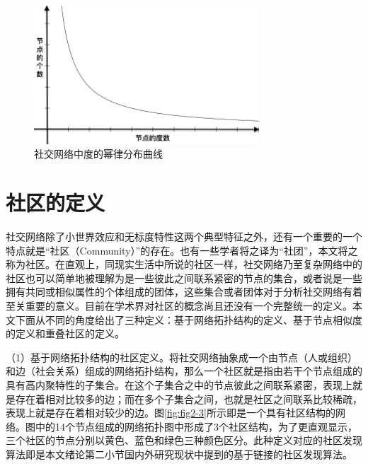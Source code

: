 \begin{figure}
  \centering
  \includegraphics[width=0.75\textwidth]{figures/fig2-2}
  \caption{社交网络中度的幂律分布曲线}\label{fig2-2}
\end{figure}

\section{社区的定义}

社交网络除了小世界效应和无标度特性这两个典型特征之外，还有一个重要的一个特点就是“社区（Community）”的存在。也有一些学者将之译为“社团”，本文将之称为社区。在直观上，同现实生活中所说的社区一样，社交网络乃至复杂网络中的社区也可以简单地被理解为是一些彼此之间联系紧密的节点的集合，或者说是一些拥有共同或相似属性的个体组成的团体，这些集合或者团体对于分析社交网络有着至关重要的意义。目前在学术界对社区的概念尚且还没有一个完整统一的定义。本文下面从不同的角度给出了三种定义：基于网络拓扑结构的定义、基于节点相似度的定义和重叠社区的定义。

（1）基于网络拓扑结构的社区定义。将社交网络抽象成一个由节点（人或组织）和边（社会关系）组成的网络拓扑结构，那么一个社区就是指由若干个节点组成的具有高内聚特性的子集合。在这个子集合之中的节点彼此之间联系紧密，表现上就是存在着相对比较多的边；而在多个子集合之间，也就是社区之间联系比较稀疏，表现上就是存在着相对较少的边。图\ref{fig:fig2-3}所示即是一个具有社区结构的网络。图中的14个节点组成的网络拓扑图中形成了3个社区结构，为了更直观显示，三个社区的节点分别以黄色、蓝色和绿色三种颜色区分。此种定义对应的社区发现算法即是本文绪论第二小节国内外研究现状中提到的基于链接的社区发现算法。

